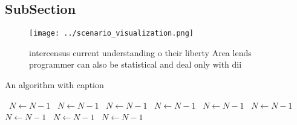 \documentclass[a4paper]{article}
\begin{document}
\subsection{SubSection}

\begin{figure}
\centering
\texttt{[image: ../scenario\_visualization.png]}
\caption{ intercensus current understanding o their liberty Area lends programmer can also be statistical and deal only with dii
}
\end{figure}
 
\begin{algorithm}
\caption{An algorithm with caption}
\begin{algorithmic}
\    \State $N \gets N - 1$
\    \State $N \gets N - 1$
\    \State $N \gets N - 1$
\    \State $N \gets N - 1$
\    \State $N \gets N - 1$
\    \State $N \gets N - 1$
\    \State $N \gets N - 1$
\    \State $N \gets N - 1$
\    \State $N \gets N - 1$
\EndWhile
\end{algorithmic}
\end{algorithm}
\end{document}
